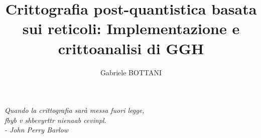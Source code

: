 \documentclass[a4paper,12pt]{report}
\theoremstyle{definition}
\begin{document}
\title{Crittografia post-quantistica basata sui reticoli: Implementazione e crittoanalisi di GGH}
\author{Gabriele BOTTANI}
\figurespagetrue
\tablespagetrue
% 
%
\beforepreface
\prefacesection{}
\begin{flushright}
  {\Large 
  \textsl{Quando la crittografia sarà messa fuori legge,\\
  fbyb v shbevyrttr nienaab cevinpl.\\[10pt]
  - John Perry Barlow}
  }
\end{flushright}
\afterpreface
% 
% 

%

%

%

%

%

%

%
%
\end{document}
